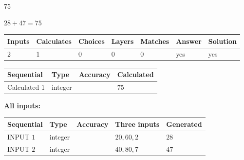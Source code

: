 \documentclass[12pt]{article}
\begin{document}
 

75
 
 
\noindent{}
 
 

 
 
 
\noindent{}
 
 

$ %
28 +  %
47=   %
75$
 
 
\noindent{}
 
 

 
   
   
   
   
\noindent\begin{tabular}{|l|l|l|l|l|l|l|}
 \hline
Inputs & Calculates & Choices & Layers & Matches & Answer & Solution \\ \hline
 2  & 
 1  & 
 0
  & 
 0  & 
 0  & 
  yes & 
  yes 
  \\ \hline
 \end{tabular}
   
   
   
   
\noindent{}
   
   
  
  
\noindent\begin{tabular}{|l|l|l|l|}
\hline
 Sequential & Type & Accuracy & Calculated \\ 
\hline
 
 
  Calculated $  1 $ & integer &  & 
  $ 75 $ 
 \\  \hline  
 \end{tabular}
   
   
   
   
\noindent\vspace{0.1in}\hspace{-0.08in} {\textbf{\Large{All inputs: }}}
   
   
  
  
\noindent\begin{tabular}{|l|l|l|l|l|}
\hline
 Sequential & Type & Accuracy & Three inputs & Generated \\ 
\hline
 
 
  INPUT $  1 $ & integer &  & $
 20
 , 
 60
 , 
 2
 $ & $ 28 $ 
 \\  \hline  
 
 
  INPUT $  2 $ & integer &  & $
 40
 , 
 80
 , 
 7
 $ & $ 47 $ 
 \\  \hline  
 \end{tabular}
   
\end{document}
